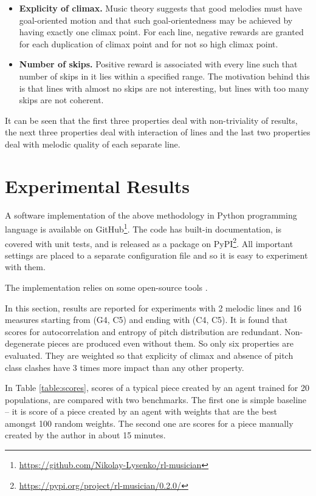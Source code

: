 \documentclass{article}
\begin{document}
\begin{itemize}
    \item \textbf{Explicity of climax.} Music theory suggests that good melodies must have goal-oriented motion and that such goal-orientedness may be achieved by having exactly one climax point. For each line, negative rewards are granted for each duplication of climax point and for not so high climax point.
    \item \textbf{Number of skips.} Positive reward is associated with every line such that number of skips in it lies within a specified range. The motivation behind this is that lines with almost no skips are not interesting, but lines with too many skips are not coherent.
\end{itemize}

It can be seen that the first three properties deal with non-triviality of results, the next three properties deal with interaction of lines and the last two properties deal with melodic quality of each separate line. 


\section{Experimental Results}
\label{sec:results}

A software implementation of the above methodology in Python programming language is available on GitHub\footnote{\url{https://github.com/Nikolay-Lysenko/rl-musician}}. The code has built-in documentation, is covered with unit tests, and is released as a package on PyPI\footnote{\url{https://pypi.org/project/rl-musician/0.2.0/}}. All important settings are placed to a separate configuration file and so it is easy to experiment with them.

The implementation relies on some open-source tools \cite{brockman2016openai,chollet2015keras,oliphant2006guide,raffel2014intuitive}.

In this section, results are reported for experiments with 2 melodic lines and 16 measures starting from (G4, C5) and ending with (C4, C5). It is found that scores for autocorrelation and entropy of pitch distribution are redundant. Non-degenerate pieces are produced even without them. So only six properties are evaluated. They are weighted so that explicity of climax and absence of pitch class clashes have 3 times more impact than any other property.

In Table \ref{table:scores}, scores of a typical piece created by an agent trained for 20 populations, are compared with two benchmarks. The first one is simple baseline -- it is score of a piece created by an agent with weights that are the best amongst 100 random weights. The second one are scores for a piece manually created by the author in about 15 minutes.
\end{document}
